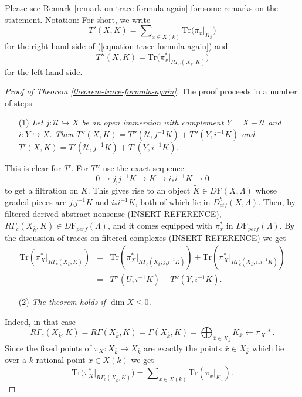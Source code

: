 \noindent
Please see Remark \ref{remark-on-trace-formula-again} for some remarks
on the statement. Notation: For short, we write
$$
T'(X, K) =
\sum\nolimits_{x\in X(k)}
\text{Tr}\big(\pi_x\big|_{K_{\bar x}}\big)
$$
for the right-hand side of (\ref{equation-trace-formula-again}) and
$$
T''(X, K)
=\text{Tr}\big(\pi_x^*\big|_{R\Gamma_c(X_{\bar k}, K)}\big)
$$
for the left-hand side.

\begin{proof}[Proof of Theorem \ref{theorem-trace-formula-again}]
The proof proceeds in a number of steps.
\begin{enumerate}
\item[(1)]
{\it Let $j: \mathcal{U}\hookrightarrow X$ be an open immersion with complement
$Y = X - \mathcal{U}$ and $i: Y \hookrightarrow X$. Then
$T''(X, K) = T''(\mathcal{U}, j^{-1} K)+ T''(Y, i^{-1}K)$ and
$T'(X, K) = T'(\mathcal{U}, j^{-1} K)+ T'(Y, i^{-1}K)$.}
\end{enumerate}
This is clear for $T'$. For $T''$ use the exact sequence
$$
0\to j_!j^{-1} K \to K \to i_* i^{-1} K \to 0
$$
to get a filtration on $K$. This gives rise to an object
$\widetilde K \in D\mathrm{F}(X, \Lambda)$
whose graded pieces are $j_!j^{-1}K$ and $i_*i^{-1}K$,
both of which lie in $D_{ctf}^b(X, \Lambda)$. Then, by filtered derived
abstract nonsense (INSERT REFERENCE),
$R\Gamma_c(X_{\bar k}, K)\in D\mathrm{F}_{perf}(\Lambda)$,
and it comes equipped with $\pi_x^*$ in
$D\mathrm{F}_{perf}(\Lambda)$.
By the discussion of traces on filtered complexes (INSERT REFERENCE) we get
\begin{eqnarray*}
\text{Tr}\left(\pi_X^*\big|_{R\Gamma_c(X_{\bar k}, K)}\right)
& = & \text{Tr}\left(\pi_X^*\big|_{R\Gamma_c(X_{\bar k}, j_!j^{-1}K)}\right)+
\text{Tr}\left(\pi_X^*\big|_{R\Gamma_c(X_{\bar k}, i_*i^{-1}K)}\right)
\\
& = & T''(U, i^{-1}K) + T''(Y, i^{-1}K).
\end{eqnarray*}
\begin{enumerate}
\item[(2)]
{\it The theorem holds if $\dim X\leq 0$. }
\end{enumerate}
Indeed, in that case
$$
R\Gamma_c(X_{\bar k}, K) = R\Gamma(X_{\bar k}, K) = \Gamma(X_{\bar k}, K) =
\bigoplus_{\bar x\in X_{\bar k}} K_{\bar x} \leftarrow \pi_X*.
$$
Since the fixed points of $\pi_X: X_{\bar k}\to X_{\bar k}$ are exactly the
points $\bar x\in X_{\bar k}$ which lie over a $k$-rational point $x\in X(k)$
we get
$$
\text{Tr}\big(\pi_X^*|_{R\Gamma_c(X_{\bar k}, K)}\big) =
\sum\nolimits_{x\in X(k)}\text{Tr}(\pi_{\bar x}|_{K_{\bar x}}).
$$
\end{proof}
